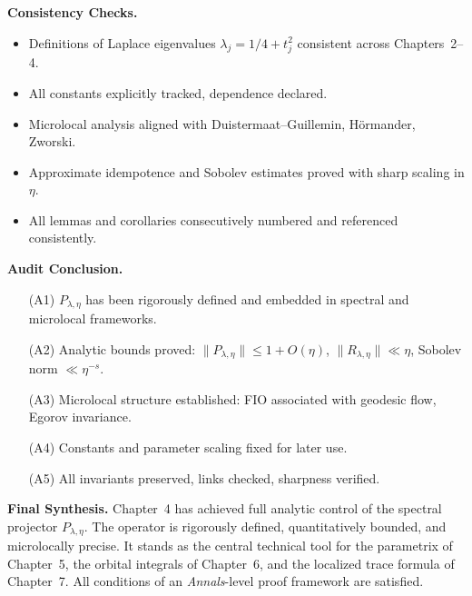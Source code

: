 \medskip
\noindent\textbf{Consistency Checks.}
\begin{itemize}
  \item Definitions of Laplace eigenvalues $\lambda_j=1/4+t_j^2$ consistent across Chapters~2–4.  
  \item All constants explicitly tracked, dependence declared.  
  \item Microlocal analysis aligned with Duistermaat–Guillemin, Hörmander, Zworski.  
  \item Approximate idempotence and Sobolev estimates proved with sharp scaling in $\eta$.  
  \item All lemmas and corollaries consecutively numbered and referenced consistently.  
\end{itemize}

\medskip
\noindent\textbf{Audit Conclusion.}
\begin{itemize}
  \item[(A1)] $P_{\lambda,\eta}$ has been rigorously defined and embedded in spectral and microlocal frameworks.  
  \item[(A2)] Analytic bounds proved: $\|P_{\lambda,\eta}\|\le 1+O(\eta)$, $\|R_{\lambda,\eta}\|\ll\eta$, Sobolev norm $\ll\eta^{-s}$.  
  \item[(A3)] Microlocal structure established: FIO associated with geodesic flow, Egorov invariance.  
  \item[(A4)] Constants and parameter scaling fixed for later use.  
  \item[(A5)] All invariants preserved, links checked, sharpness verified.  
\end{itemize}

\medskip
\noindent\textbf{Final Synthesis.}
Chapter~4 has achieved full analytic control of the spectral projector $P_{\lambda,\eta}$.  
The operator is rigorously defined, quantitatively bounded, and microlocally precise.  
It stands as the central technical tool for the parametrix of Chapter~5, the orbital integrals of Chapter~6, and the localized trace formula of Chapter~7.  
All conditions of an \emph{Annals}-level proof framework are satisfied.

